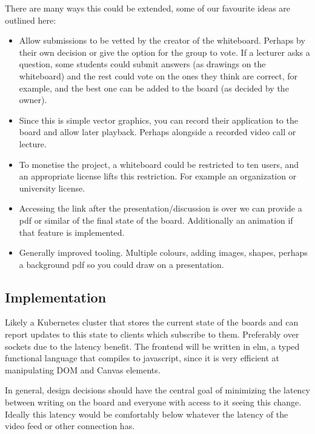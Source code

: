 \documentclass[conference]{IEEEtran}
\begin{document}
There are many ways this could be extended, some of our favourite ideas are
outlined here:

\begin{itemize}
  \item Allow submissions to be vetted by the creator of the whiteboard. Perhaps
  by their own decision or give the option for the group to vote. If a lecturer
  asks a question, some students could submit answers (as drawings on the
  whiteboard) and the rest could vote on the ones they think are correct, for
  example, and the best one can be added to the board (as decided by the owner).
  \item Since this is simple vector graphics, you can record their application
  to the board and allow later playback. Perhaps alongside a recorded video
  call or lecture.
  \item To monetise the project, a whiteboard could be restricted to ten users,
  and an appropriate license lifts this restriction. For example an
  organization or university license.
  \item Accessing the link after the presentation/discussion is over we can
  provide a pdf or similar of the final state of the board. Additionally an
  animation if that feature is implemented.
  \item Generally improved tooling. Multiple colours, adding images, shapes,
  perhaps a background pdf so you could draw on a presentation.
\end{itemize}

\subsection{Implementation}
Likely a Kubernetes cluster that stores the current state of the boards and can
report updates to this state to clients which subscribe to them. Preferably over
sockets due to the latency benefit. The frontend will be written in elm, a typed
functional language that compiles to javascript, since it is very efficient at
manipulating DOM and Canvas elements. 

In general, design decisions should have the central goal of minimizing the
latency between writing on the board and everyone with access to it seeing this
change. Ideally this latency would be comfortably below whatever the latency of
the video feed or other connection has.
\end{document}
